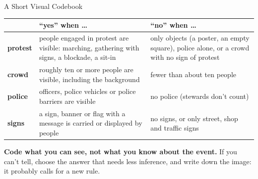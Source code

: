 \begin{frame}{A Short Visual Codebook}
\vspace{0.1cm}
{\footnotesize
\begin{tabular}{@{}>{\bfseries}l>{\raggedright\arraybackslash}p{6.1cm}>{\raggedright\arraybackslash}p{5.2cm}@{}}
\toprule
 & \textbf{``yes'' when \ldots} & \textbf{``no'' when \ldots} \\
\midrule
protest & people engaged in protest are visible: marching, gathering with signs, a blockade, a sit-in & only objects (a poster, an empty square), police alone, or a crowd with no sign of protest \\[2pt]
crowd & roughly ten or more people are visible, including the background & fewer than about ten people \\[2pt]
police & officers, police vehicles or police barriers are visible & no police (stewards don't count) \\[2pt]
signs & a sign, banner or flag with a message is carried or displayed by people & no signs, or only street, shop and traffic signs \\
\bottomrule
\end{tabular}}

\vspace{0.3cm}
\begin{navybox}
\textbf{Code what you can see, not what you know about the event.} If you can't tell, choose the
answer that needs less inference, and write down the image: it probably calls for a new rule.
\end{navybox}
\end{frame}

